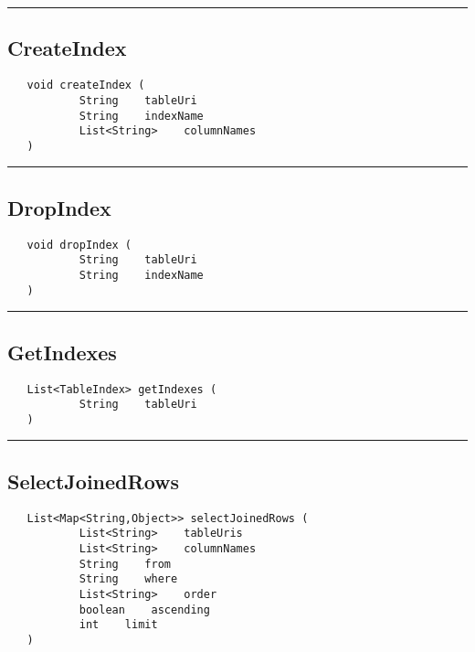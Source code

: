 \rule{15cm}{2pt}
\subsection{CreateIndex}
\label{Api:CreateIndex}
\begin{verbatim}
   void createIndex (
           String    tableUri
           String    indexName
           List<String>    columnNames
   )
\end{verbatim}



\rule{15cm}{2pt}
\subsection{DropIndex}
\label{Api:DropIndex}
\begin{verbatim}
   void dropIndex (
           String    tableUri
           String    indexName
   )
\end{verbatim}



\rule{15cm}{2pt}
\subsection{GetIndexes}
\label{Api:GetIndexes}
\begin{verbatim}
   List<TableIndex> getIndexes (
           String    tableUri
   )
\end{verbatim}



\rule{15cm}{2pt}
\subsection{SelectJoinedRows}
\label{Api:SelectJoinedRows}
\begin{verbatim}
   List<Map<String,Object>> selectJoinedRows (
           List<String>    tableUris
           List<String>    columnNames
           String    from
           String    where
           List<String>    order
           boolean    ascending
           int    limit
   )
\end{verbatim}



